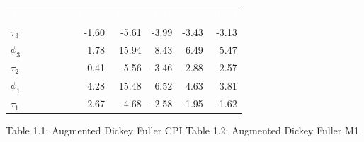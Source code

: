 \documentclass{article}
\newenvironment{myenv}
{
    \color{mydarkblue} %
    \fontsize{9pt}{9pt}\selectfont %

}
{
}
\begin{document}
\begin{adjustbox}{width=\textwidth}
            
            \begin{tabular}{lrrrrr}
                \rowcolor{mydarkblue}
                \textcolor{white}{Test Statistic}     & \textcolor{white}{$I(0)$}        & \textcolor{white}{$I(1)$}            & \textcolor{white}{1pct}           & \textcolor{white}{5pct}     & \textcolor{white}{10pct}             \\
                $\tau_3$                              &-1.60                                  &-5.61                                      &-3.99                              &-3.43                        &-3.13                                 \\
                $\phi_3$                              & 1.78                                  & 15.94                                     & 8.43                              & 6.49                        & 5.47                                 \\
                $\tau_2$                              & 0.41                                  &-5.56                                      &-3.46                              &-2.88                        &-2.57                                 \\
                $\phi_1$                              & 4.28                                  &15.48                                      & 6.52                              & 4.63                        & 3.81                                 \\
                $\tau_1$                              & 2.67                                  &-4.68                                      &-2.58                              &-1.95                        &-1.62                                 \\
            \end{tabular}
            \vspace*{0.5cm}
    \end{adjustbox}
    \begin{myenv}
        \hspace*{0.1\textwidth}
        Table 1.1: Augmented Dickey Fuller CPI
        \hspace*{0.15\textwidth}
        Table 1.2: Augmented Dickey Fuller M1
    \end{myenv}
            

    
\end{document}
